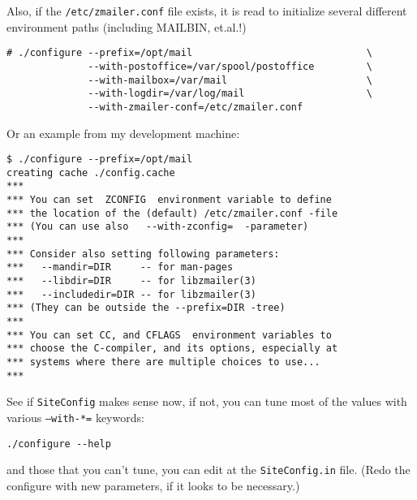 Also, if the {\tt /etc/zmailer.conf} file exists, it is read
to initialize several different environment paths (including
MAILBIN, et.al.!)
\begin{verbatim}
# ./configure --prefix=/opt/mail                              \
              --with-postoffice=/var/spool/postoffice         \
              --with-mailbox=/var/mail                        \
              --with-logdir=/var/log/mail                     \
              --with-zmailer-conf=/etc/zmailer.conf
\end{verbatim}

Or an example from my development machine:
\begin{verbatim}
$ ./configure --prefix=/opt/mail
creating cache ./config.cache
***
*** You can set  ZCONFIG  environment variable to define
*** the location of the (default) /etc/zmailer.conf -file
*** (You can use also   --with-zconfig=  -parameter)
***
*** Consider also setting following parameters:
***   --mandir=DIR     -- for man-pages
***   --libdir=DIR     -- for libzmailer(3)
***   --includedir=DIR -- for libzmailer(3)
*** (They can be outside the --prefix=DIR -tree)
***
*** You can set CC, and CFLAGS  environment variables to
*** choose the C-compiler, and its options, especially at
*** systems where there are multiple choices to use...
***
\end{verbatim}

See if {\tt SiteConfig} makes sense now, if not, you can tune
most of the values with various {\tt --with-*=} keywords:
\begin{verbatim}
./configure --help
\end{verbatim}

and those that you can't tune, you can edit at the {\tt SiteConfig.in}
file.  (Redo the configure with new parameters, if it looks to be
necessary.)

